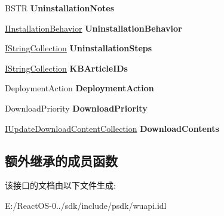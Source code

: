 \begin{DoxyCompactItemize}
B\+S\+TR {\bfseries Uninstallation\+Notes}
\item 
\mbox{\label{interface_w_u_api_lib_1_1_i_update_ac9e29e85b91399932076db7b6effc29e}} 
\hyperlink{interface_w_u_api_lib_1_1_i_installation_behavior}{I\+Installation\+Behavior} {\bfseries Uninstallation\+Behavior}
\item 
\mbox{\label{interface_w_u_api_lib_1_1_i_update_ae64e736786a36b680f9f40569a23dadf}} 
\hyperlink{interface_w_u_api_lib_1_1_i_string_collection}{I\+String\+Collection} {\bfseries Uninstallation\+Steps}
\item 
\mbox{\label{interface_w_u_api_lib_1_1_i_update_aad0ab021826db7010834bd52d88b8880}} 
\hyperlink{interface_w_u_api_lib_1_1_i_string_collection}{I\+String\+Collection} {\bfseries K\+B\+Article\+I\+Ds}
\item 
\mbox{\label{interface_w_u_api_lib_1_1_i_update_a5d527444e533b425be0890e50dd6d854}} 
Deployment\+Action {\bfseries Deployment\+Action}
\item 
\mbox{\label{interface_w_u_api_lib_1_1_i_update_a43fc3a0b745b012e218dc522c007aa22}} 
Download\+Priority {\bfseries Download\+Priority}
\item 
\mbox{\label{interface_w_u_api_lib_1_1_i_update_add989d41dd8ff4f4fbca9070d26d9b4b}} 
\hyperlink{interface_w_u_api_lib_1_1_i_update_download_content_collection}{I\+Update\+Download\+Content\+Collection} {\bfseries Download\+Contents}
\end{DoxyCompactItemize}
\subsection*{额外继承的成员函数}


该接口的文档由以下文件生成\+:\begin{DoxyCompactItemize}
\item 
E\+:/\+React\+O\+S-\/0../sdk/include/psdk/wuapi.\+idl\end{DoxyCompactItemize}
